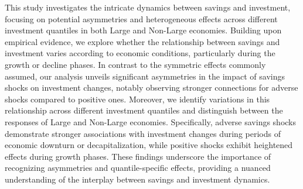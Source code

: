 
\begin{Abstrakt}
    This study investigates the intricate dynamics between savings and investment, focusing on potential asymmetries and heterogeneous effects across different investment quantiles in both Large and Non-Large economies. Building upon empirical evidence, we explore whether the relationship between savings and investment varies according to economic conditions, particularly during the growth or decline phases. In contrast to the symmetric effects commonly assumed, our analysis unveils significant asymmetries in the impact of savings shocks on investment changes, notably observing stronger connections for adverse shocks compared to positive ones. Moreover, we identify variations in this relationship across different investment quantiles and distinguish between the responses of Large and Non-Large economies. Specifically, adverse savings shocks demonstrate stronger associations with investment changes during periods of economic downturn or decapitalization, while positive shocks exhibit heightened effects during growth phases. These findings underscore the importance of recognizing asymmetries and quantile-specific effects, providing a nuanced understanding of the interplay between savings and investment dynamics.
\end{Abstrakt}



\clearpage